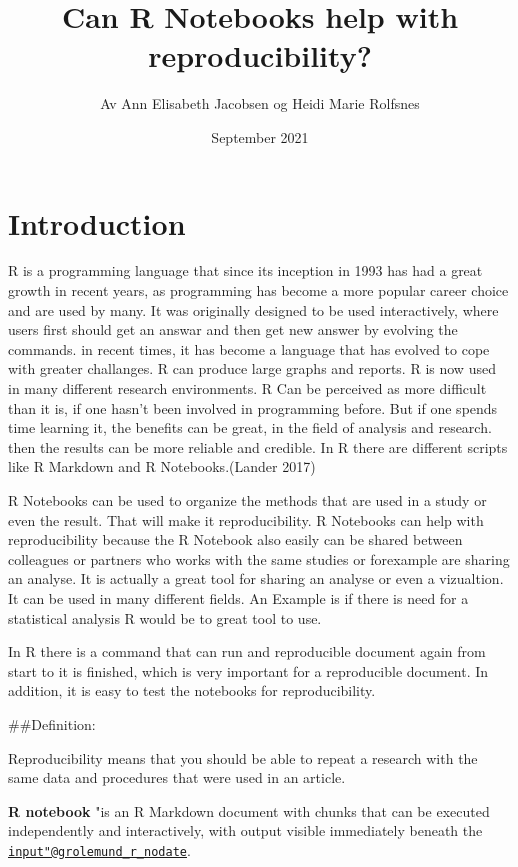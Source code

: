 \documentclass[
]{article}
\title{Can R Notebooks help with reproducibility?}
\author{Av Ann Elisabeth Jacobsen og Heidi Marie Rolfsnes}
\date{September 2021}
\begin{document}
\maketitle

\hypertarget{introduction}{%
\section{Introduction}\label{introduction}}

R is a programming language that since its inception in 1993 has had a
great growth in recent years, as programming has become a more popular
career choice and are used by many. It was originally designed to be
used interactively, where users first should get an answar and then get
new answer by evolving the commands. in recent times, it has become a
language that has evolved to cope with greater challanges. R can produce
large graphs and reports. R is now used in many different research
environments. R Can be perceived as more difficult than it is, if one
hasn't been involved in programming before. But if one spends time
learning it, the benefits can be great, in the field of analysis and
research. then the results can be more reliable and credible. In R there
are different scripts like R Markdown and R Notebooks.(Lander 2017)

R Notebooks can be used to organize the methods that are used in a study
or even the result. That will make it reproducibility. R Notebooks can
help with reproducibility because the R Notebook also easily can be
shared between colleagues or partners who works with the same studies or
forexample are sharing an analyse. It is actually a great tool for
sharing an analyse or even a vizualtion. It can be used in many
different fields. An Example is if there is need for a statistical
analysis R would be to great tool to use.

In R there is a command that can run and reproducible document again
from start to it is finished, which is very important for a reproducible
document. In addition, it is easy to test the notebooks for
reproducibility.

\#\#Definition:

Reproducibility means that you should be able to repeat a research with
the same data and procedures that were used in an article.

\textbf{R notebook} "is an R Markdown document with chunks that can be
executed independently and interactively, with output visible
immediately beneath the
\href{mailto:input\%22@grolemund_r_nodate}{\nolinkurl{input"@grolemund\_r\_nodate}}.
\end{document}
